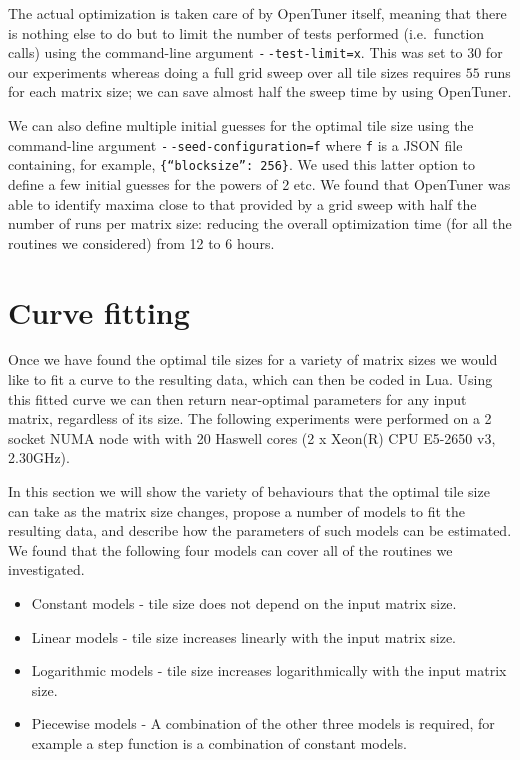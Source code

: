 \documentclass[a4paper,12pt]{article}
\begin{document}
The actual optimization is taken care of by OpenTuner itself,
meaning that there is nothing else to do but to limit
the number of tests performed (i.e.\ function calls)
using the command-line argument
\texttt{-$\,$-test-limit=x}.
This was set to $30$ for our experiments whereas doing a full
grid sweep over all tile sizes requires $55$ runs for each matrix size;
we can save almost half the sweep time by using OpenTuner.

We can also define multiple initial guesses for the optimal
tile size using the command-line argument
\texttt{-$\,$-seed-configuration=f} where \texttt{f} is a JSON
file containing, for example, \texttt{\{``blocksize'': 256\}}.
We used this latter option to define a few initial guesses
for the powers of 2 etc.
We found that OpenTuner was able to identify maxima
close to that provided by a grid sweep with half the number of runs
per matrix size:
reducing the overall optimization time (for all the routines we considered)
from 12 to 6 hours.

\section{Curve fitting}
\label{sec.curvefitting}
Once we have found the optimal tile sizes for a variety of matrix
sizes we would like to fit a curve to the resulting data,
which can then be coded in Lua.
Using this fitted curve we can then return near-optimal
parameters for any input matrix,
regardless of its size.
The following experiments were performed
on a 2 socket NUMA node with
with 20 Haswell cores (2 x Xeon(R) CPU E5-2650 v3, 2.30GHz).

In this section we will show the variety of behaviours
that the optimal tile size can take as the matrix size changes,
propose a number of models to fit the resulting data,
and describe how the parameters of such models can be estimated.
We found that the following four models can cover all
of the routines we investigated.

\begin{itemize}
\item Constant models - tile size does not depend on the input matrix size.
\item Linear models - tile size increases linearly with the input matrix size.
\item Logarithmic models - tile size increases logarithmically with the
  input matrix size.
\item Piecewise models - A combination of the other three models is required,
  for example a step function is a combination of constant models.
\end{itemize}
\end{document}
